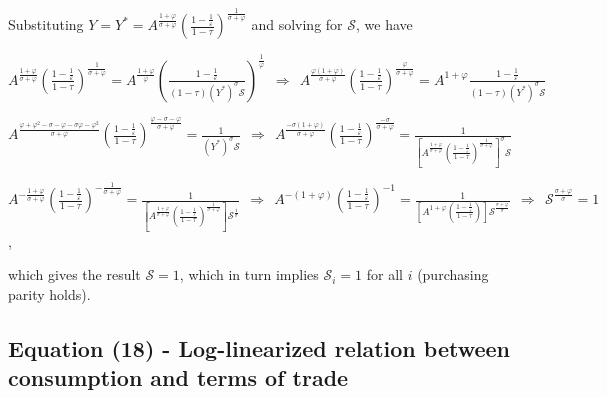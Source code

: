 \documentclass[
]{article}
\begin{document}
Substituting
\(\displaystyle Y=Y^*=A^{\frac{1+\varphi}{\sigma+\varphi}} \left( \frac{1-\frac{1}{\varepsilon}}{1-\tau} \right)^{\frac{1}{\sigma+\varphi}}\)
and solving for \(\mathcal{S}\), we have

\(\displaystyle A^{\frac{1+\varphi}{\sigma+\varphi}} \left( \frac{1-\frac{1}{\varepsilon}}{1-\tau} \right)^{\frac{1}{\sigma+\varphi}}=A^{\frac{1+\varphi}{\varphi}} \left( \frac{1-\frac{1}{\varepsilon}}{(1-\tau)(Y^*)^\sigma \mathcal{S}} \right)^\frac{1}{\varphi} \ \ \Rightarrow \ \ A^{\frac{\varphi({1+\varphi})}{\sigma+\varphi}} \left( \frac{1-\frac{1}{\varepsilon}}{1-\tau} \right)^{\frac{\varphi}{\sigma+\varphi}}=A^{1+\varphi} \frac{1-\frac{1}{\varepsilon}}{(1-\tau)(Y^*)^\sigma \mathcal{S}}\)

\(\displaystyle A^{\frac{\varphi+\varphi^2-\sigma-\varphi -\sigma\varphi-\varphi^2}{\sigma+\varphi}} \left( \frac{1-\frac{1}{\varepsilon}}{1-\tau} \right)^{\frac{\varphi-\sigma-\varphi}{\sigma+\varphi}} = \frac{1}{(Y^*)^\sigma \mathcal{S}} \ \ \Rightarrow \ \  A^{\frac{-\sigma(1+\varphi)}{\sigma+\varphi}} \left( \frac{1-\frac{1}{\varepsilon}}{1-\tau} \right)^{\frac{-\sigma}{\sigma+\varphi}} = \frac{1}{\left[A^{\frac{1+\varphi}{\sigma+\varphi}} \left( \frac{1-\frac{1}{\varepsilon}}{1-\tau} \right)^{\frac{1}{\sigma+\varphi}} \right]^\sigma \mathcal{S}}\)

\(\displaystyle A^{-\frac{1+\varphi}{\sigma+\varphi}} \left( \frac{1-\frac{1}{\varepsilon}}{1-\tau} \right)^{-\frac{1}{\sigma+\varphi}} = \frac{1}{\left[A^{\frac{1+\varphi}{\sigma+\varphi}} \left( \frac{1-\frac{1}{\varepsilon}}{1-\tau} \right)^{\frac{1}{\sigma+\varphi}} \right] \mathcal{S}^{\frac{1}{\sigma}}} \ \ \Rightarrow \ \ A^{-(1+\varphi)} \left( \frac{1-\frac{1}{\varepsilon}}{1-\tau} \right)^{-1} = \frac{1}{\left[A^{1+\varphi}\left( \frac{1-\frac{1}{\varepsilon}}{1-\tau} \right) \right] \mathcal{S}^{\frac{\sigma+\varphi}{\sigma}}} \ \ \Rightarrow \ \ \mathcal{S}^{\frac{\sigma+\varphi}{\sigma}}=1\),

which gives the result \(\mathcal{S}=1\), which in turn implies
\(\mathcal{S}_i=1\) for all \(i\) (purchasing parity holds).

\vspace{12pt}

\hypertarget{equation-18---log-linearized-relation-between-consumption-and-terms-of-trade}{%
\subsection{Equation (18) - Log-linearized relation between consumption
and terms of
trade}\label{equation-18---log-linearized-relation-between-consumption-and-terms-of-trade}}
\end{document}
